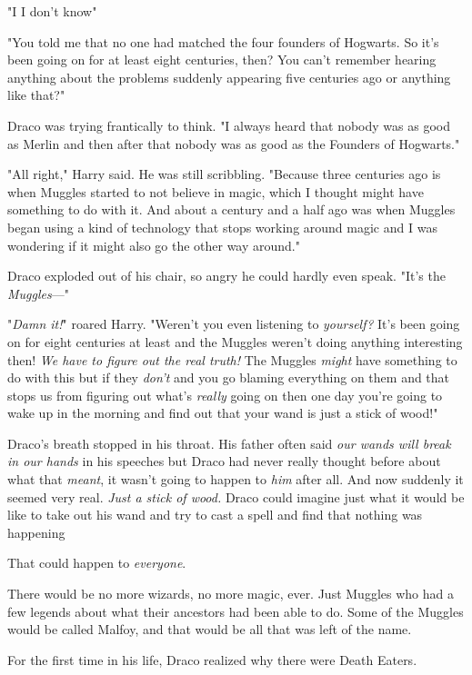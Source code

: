 "I{\el} I don't know{\el}"

"You told me that no one had matched the four founders of Hogwarts. So it's
been going on for at least eight centuries, then? You can't remember hearing
anything about the problems suddenly appearing five centuries ago or anything
like that?"

Draco was trying frantically to think. "I always heard that nobody was as good
as Merlin and then after that nobody was as good as the Founders of Hogwarts."

"All right," Harry said. He was still scribbling. "Because three centuries ago
is when Muggles started to not believe in magic, which I thought might have
something to do with it. And about a century and a half ago was when Muggles
began using a kind of technology that stops working around magic and I was
wondering if it might also go the other way around."

Draco exploded out of his chair, so angry he could hardly even speak. "It's the
\emph{Muggles}\mbox{---}"

"\emph{Damn it!}" roared Harry. "Weren't you even listening to \emph{yourself?}
It's been going on for eight centuries at least and the Muggles weren't doing
anything interesting then! \emph{We have to figure out the real truth!} The
Muggles \emph{might} have something to do with this but if they \emph{don't}
and you go blaming everything on them and that stops us from figuring out
what's \emph{really} going on then one day you're going to wake up in the
morning and find out that your wand is just a stick of wood!"

Draco's breath stopped in his throat. His father often said \emph{our wands
will break in our hands} in his speeches but Draco had never really thought
before about what that \emph{meant}, it wasn't going to happen to \emph{him}
after all. And now suddenly it seemed very real. \emph{Just a stick of wood.}
Draco could imagine just what it would be like to take out his wand and try to
cast a spell and find that nothing was happening{\el}

That could happen to \emph{everyone}.

There would be no more wizards, no more magic, ever. Just Muggles who had a few
legends about what their ancestors had been able to do. Some of the Muggles
would be called Malfoy, and that would be all that was left of the name.

For the first time in his life, Draco realized why there were Death Eaters.


